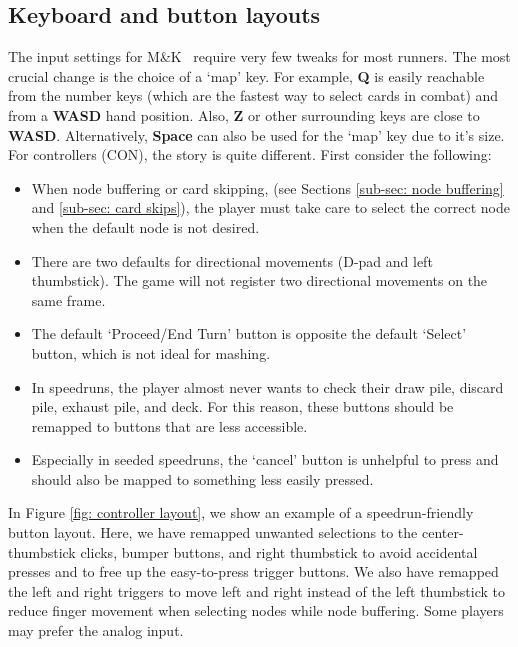\documentclass[12pt]{amsart}
\newcommand{\mk}{\textsf{M\&K}}
\newcommand{\con}{\textsf{CON}}
\begin{document}
\subsection{Keyboard and button layouts}
The input settings for \mk~ require very few tweaks for most runners.  
The most crucial change is the choice of a `map' key.  
For example, \textbf{Q} is easily reachable from the number keys (which are the fastest way to select cards in combat) and from a \textbf{WASD} hand position. 
Also, \textbf{Z} or other surrounding keys are close to \textbf{WASD}.  
Alternatively, \textbf{Space} can also be used for the `map' key due to it's size.  \\

For controllers (\con), the story is quite different.  
First consider the following: 
\begin{itemize}
    \item 
        When node buffering or card skipping, (see Sections \ref{sub-sec: node buffering} and \ref{sub-sec: card skips}), the player must take care to select the correct node when the default node is not desired.  
    \item 
        There are two defaults for directional movements (D-pad and left thumbstick).  
        The game will not register two directional movements on the same frame.  
    \item 
       The default `Proceed/End Turn' button is opposite the default `Select' button, which is not ideal for mashing.  
    \item 
        In speedruns, the player almost never wants to check their draw pile, discard pile, exhaust pile, and deck.  
        For this reason, these buttons should be remapped to buttons that are less accessible.  
    \item 
        Especially in seeded speedruns, the `cancel' button is unhelpful to press and should also be mapped to something less easily pressed.  
\end{itemize}
In Figure \ref{fig: controller layout}, we show an example of a speedrun-friendly button layout.  
Here, we have remapped unwanted selections to the center-thumbstick clicks, bumper buttons, and right thumbstick to avoid accidental presses and to free up the easy-to-press trigger buttons.  
We also have remapped the left and right triggers to move left and right instead of the left thumbstick to reduce finger movement when selecting nodes while node buffering.  
Some players may prefer the analog input.  
\end{document}
